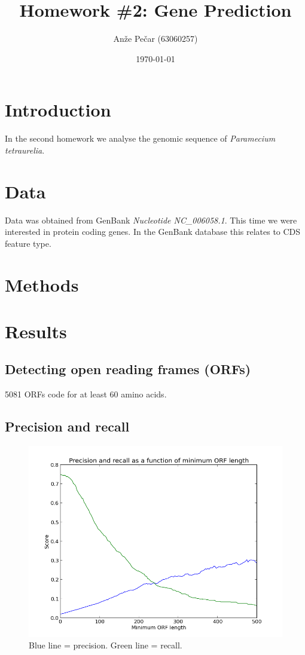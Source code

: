 \documentclass[a4paper,11pt]{article}
\title{Homework \#2: Gene Prediction}
\author{Anže Pečar (63060257)}
\date{\today}
\begin{document}
\maketitle

\section{Introduction}

In the second homework we analyse the genomic sequence of \textit{Paramecium tetraurelia}.

\section{Data}

Data was obtained from GenBank \textit{Nucleotide NC\_006058.1}. This time we were interested in protein coding genes. In the GenBank database this relates to CDS feature type.

\section{Methods}

\section{Results}

\subsection{Detecting open reading frames (ORFs)}

5081 ORFs code for at least 60 amino acids.

\subsection{Precision and recall}

\begin{figure}[h!]
\begin{center}
\includegraphics[scale=0.65]{precision-recall.png}
\caption{Blue line = precision. Green line = recall.}
\label{precrec}
\end{center}
\end{figure}
\end{document}
